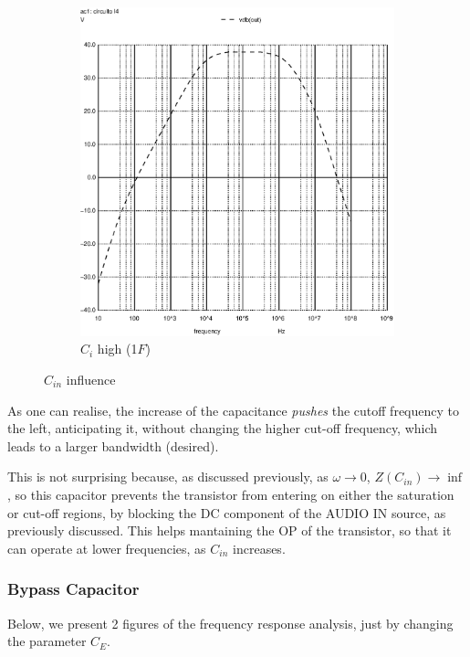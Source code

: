 \begin{figure}[h]
\begin{subfigure}{.5\textwidth}
    \includegraphics[scale=0.33]{images/cihigh_1.eps}
    \caption{$C_i$ high (1$F$)}
\end{subfigure}
\caption{$C_{in}$ influence}
\end{figure}

\pagebreak

As one can realise, the increase of the capacitance \textit{pushes} the cutoff frequency to the left, anticipating it, without changing the higher cut-off frequency, which leads to a larger bandwidth (desired).

This is not surprising because, as discussed previously, as $\omega \to 0$, $Z(C_{in}) \to \inf$, so this capacitor prevents the transistor from entering on either the saturation or cut-off regions, by blocking the DC component of the AUDIO IN source, as previously discussed. This helps mantaining the OP of the transistor, so that it can operate at lower frequencies, as $C_{in}$ increases.

\subsubsection{Bypass Capacitor}

Below, we present 2 figures of the frequency response analysis, just by changing the parameter $C_E$.

